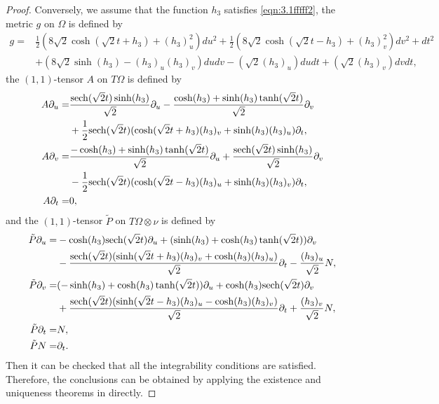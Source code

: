 \documentclass[reqno]{amsart}%
\theoremstyle{definition}
\numberwithin{equation}{section}
\begin{document}
\begin{proof}
Conversely, we assume that the function $h_3$ satisfies \eqref{eqn:3.1fffff2}, the metric $g$ on $\Omega$ is defined by
\begin{equation}\label{eqn:3.1fffff3}
\begin{aligned}
g=&\frac{1}{2}(8\sqrt{2}\cosh(\sqrt{2}t+h_3)+(h_3)_u^2)du^2
+\frac{1}{2}(8\sqrt{2}\cosh(\sqrt{2}t-h_3)+(h_3)_v^2)dv^2+dt^2\\
&+(8\sqrt{2}\sinh(h_3)-(h_3)_u(h_3)_v)dudv-(\sqrt{2}(h_3)_u)dudt+(\sqrt{2}(h_3)_v)dvdt,
\end{aligned}
\end{equation}
the $(1,1)$-tensor $A$ on $T\Omega$ is defined by
\begin{equation}\label{eqn:3.1fffff4}
\begin{aligned}
A\partial_u=&\frac{{\rm sech}(\sqrt{2}t)\sinh(h_3)}{\sqrt{2}}\partial_u
-\frac{\cosh(h_3)+\sinh(h_3)\tanh(\sqrt{2}t)}{\sqrt{2}}\partial_v\\
&+\frac{1}{2}{\rm sech}(\sqrt{2}t)(\cosh(\sqrt{2}t+h_3)(h_3)_v+\sinh(h_3)(h_3)_u)\partial_t,\\
A\partial_v=&\frac{-\cosh(h_3)+\sinh(h_3)\tanh(\sqrt{2}t)}{\sqrt{2}}\partial_u+
\frac{{\rm sech}(\sqrt{2}t)\sinh(h_3)}{\sqrt{2}}\partial_v\\
&-\frac{1}{2}{\rm sech}(\sqrt{2}t)(\cosh(\sqrt{2}t-h_3)(h_3)_u+\sinh(h_3)(h_3)_v)\partial_t,\\
A\partial_t=&0,
\end{aligned}
\end{equation}
and the $(1,1)$-tensor $\tilde{P}$ on $T\Omega\otimes \nu$ is defined by
\begin{equation}\label{eqn:3.1fffff5}
\begin{aligned}
\tilde{P}\partial_u=&-\cosh(h_3){\rm sech}(\sqrt{2}t)\partial_u+(\sinh(h_3)+\cosh(h_3)\tanh(\sqrt{2}t))\partial_v\\
&-\frac{{\rm sech}(\sqrt{2}t)(\sinh(\sqrt{2}t+h_3)(h_3)_v+\cosh(h_3)(h_3)_u)}{\sqrt{2}}\partial_t-\frac{(h_3)_u}{\sqrt{2}}N,\\
\tilde{P}\partial_v=&(-\sinh(h_3)+\cosh(h_3)\tanh(\sqrt{2}t))\partial_u+\cosh(h_3){\rm sech}(\sqrt{2}t)\partial_v\\
&+\frac{{\rm sech}(\sqrt{2}t)(\sinh(\sqrt{2}t-h_3)(h_3)_u-\cosh(h_3)(h_3)_v)}{\sqrt{2}}\partial_t+\frac{(h_3)_v}{\sqrt{2}}N,\\
\tilde{P}\partial_t=&N,\\
\tilde{P}N=&\partial_t.\\	
\end{aligned}
\end{equation}
Then it can be  checked  that all the integrability conditions are satisfied.
Therefore, the conclusions can be obtained by applying  the existence and uniqueness theorems in  \cite{K,L-T-V} directly.
\end{proof}
\end{document}
